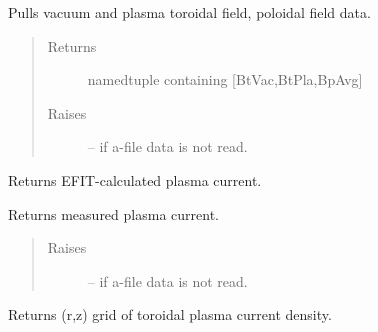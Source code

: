 \documentclass[letterpaper,10pt,english]{sphinxmanual}
\begin{document}
\begin{fulllineitems}

\begin{fulllineitems}
\label{eqtools:eqtools.eqdskreader.EqdskReader.getFields}
Pulls vacuum and plasma toroidal field, poloidal field data.
\begin{quote}\begin{description}
\item[{Returns}] \leavevmode
namedtuple containing {[}BtVac,BtPla,BpAvg{]}

\item[{Raises}] \leavevmode
{} -- 
if a-file data is not read.

\end{description}\end{quote}

\end{fulllineitems}


\begin{fulllineitems}
\label{eqtools:eqtools.eqdskreader.EqdskReader.getIpCalc}
Returns EFIT-calculated plasma current.

\end{fulllineitems}


\begin{fulllineitems}
\label{eqtools:eqtools.eqdskreader.EqdskReader.getIpMeas}
Returns measured plasma current.
\begin{quote}\begin{description}
\item[{Raises}] \leavevmode
{} -- 
if a-file data is not read.

\end{description}\end{quote}

\end{fulllineitems}


\begin{fulllineitems}
\label{eqtools:eqtools.eqdskreader.EqdskReader.getJp}
Returns (r,z) grid of toroidal plasma current density.


\end{fulllineitems}
\end{fulllineitems}
\end{document}
